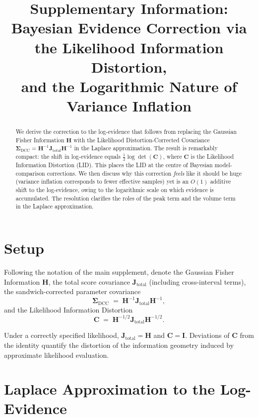 \documentclass[11pt]{article}
\title{Supplementary Information:\\
Bayesian Evidence Correction via the Likelihood Information Distortion,\\
and the Logarithmic Nature of Variance Inflation}
\author{}
\date{}
\begin{document}
\maketitle

\begin{abstract}
\noindent We derive the correction to the log-evidence that follows from replacing the Gaussian Fisher Information $\mathbf H$ with the Likelihood Distortion-Corrected Covariance $\boldsymbol\Sigma_{\mathrm{DCC}} = \mathbf H^{-1}\mathbf J_{\mathrm{total}}\mathbf H^{-1}$ in the Laplace approximation. The result is remarkably compact: the shift in log-evidence equals $\tfrac{1}{2}\log\det(\mathbf C)$, where $\mathbf C$ is the Likelihood Information Distortion (LID). This places the LID at the centre of Bayesian model-comparison corrections. We then discuss why this correction \emph{feels} like it should be huge (variance inflation corresponds to fewer effective samples) yet is an $O(1)$ additive shift to the log-evidence, owing to the logarithmic scale on which evidence is accumulated. The resolution clarifies the roles of the peak term and the volume term in the Laplace approximation.
\end{abstract}

\section{Setup}
\label{sec:setup}

Following the notation of the main supplement, denote the Gaussian Fisher Information $\mathbf H$, the total score covariance $\mathbf J_{\mathrm{total}}$ (including cross-interval terms), the sandwich-corrected parameter covariance
\begin{equation}
\boldsymbol\Sigma_{\mathrm{DCC}}
\;=\;
\mathbf H^{-1}
\mathbf J_{\mathrm{total}}
\mathbf H^{-1},
\end{equation}
and the Likelihood Information Distortion
\begin{equation}
\mathbf C
\;=\;
\mathbf H^{-1/2}
\mathbf J_{\mathrm{total}}
\mathbf H^{-1/2}.
\end{equation}

Under a correctly specified likelihood, $\mathbf J_{\mathrm{total}} = \mathbf H$ and $\mathbf C = \mathbf I$. Deviations of $\mathbf C$ from the identity quantify the distortion of the information geometry induced by approximate likelihood evaluation.

\section{Laplace Approximation to the Log-Evidence}
\label{sec:laplace-approximation}
\end{document}
